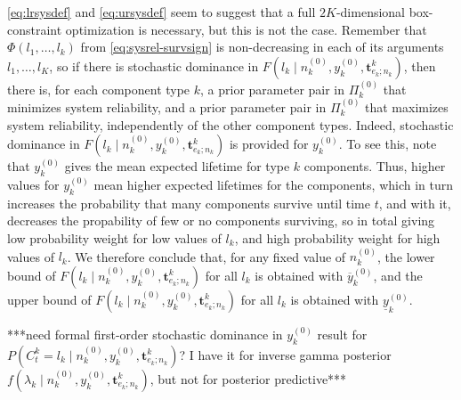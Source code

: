 \documentclass[Journal,SectionNumbers,SingleSpace,InsideFigs]{ascelike}
\renewcommand{\vec}[1]{{\bm#1}}
\newcommand{\uz}{^{(0)}} %
\newcommand{\ul}[1]{\underline{#1}}
\newcommand{\ol}[1]{\overline{#1}}
\def\ykz{y\uz_k}
\def\ykzl{\ul{y}\uz_k}
\def\ykzu{\ol{y}\uz_k}
\def\nkz{n\uz_k}
\def\PkZ{\Pi\uz_k}
\begin{document}
\eqref{eq:lrsysdef} and \eqref{eq:ursysdef} seem to suggest that
a full $2K$-dimensional box-constraint optimization is necessary,
but this is not the case.
Remember that $\Phi(l_1,\ldots,l_k)$ from \eqref{eq:sysrel-survsign} is non-decreasing in each of its arguments $l_1,\ldots,l_K$,
so if there is stochastic dominance in $F(l_k \mid \nkz,\ykz,\vec{t}^k_{e_k;n_k})$,
then there is, for each component type $k$,
a prior parameter pair in $\PkZ$ that minimizes system reliability, and
a prior parameter pair in $\PkZ$ that maximizes system reliability,
independently of the other component types. 
Indeed, stochastic dominance in $F(l_k \mid \nkz,\ykz,\vec{t}^k_{e_k;n_k})$ is provided for $\ykz$.
To see this, note that $\ykz$ gives the mean expected lifetime for type $k$ components.
Thus, higher values for $\ykz$ mean higher expected lifetimes for the components,
which in turn increases the probability that many components survive until time $t$,
and with it, decreases the propability of few or no components surviving,
so in total giving low probability weight for low values of $l_k$,
and high probability weight for high values of $l_k$. 
We therefore conclude that, for any fixed value of $\nkz$,
the lower bound of $F(l_k \mid \nkz,\ykz,\vec{t}^k_{e_k;n_k})$ for all $l_k$ is obtained with $\ykzu$, and
the upper bound of $F(l_k \mid \nkz,\ykz,\vec{t}^k_{e_k;n_k})$ for all $l_k$ is obtained with $\ykzl$.

***need formal first-order stochastic dominance in $\ykz$ result for $P(C^k_t = l_k\mid\nkz,\ykz, \vec{t}^k_{e_k;n_k})$?
I have it for inverse gamma posterior $f(\lambda_k\mid \nkz,\ykz, \vec{t}^k_{e_k;n_k})$,
but not for posterior predictive***
\end{document}
